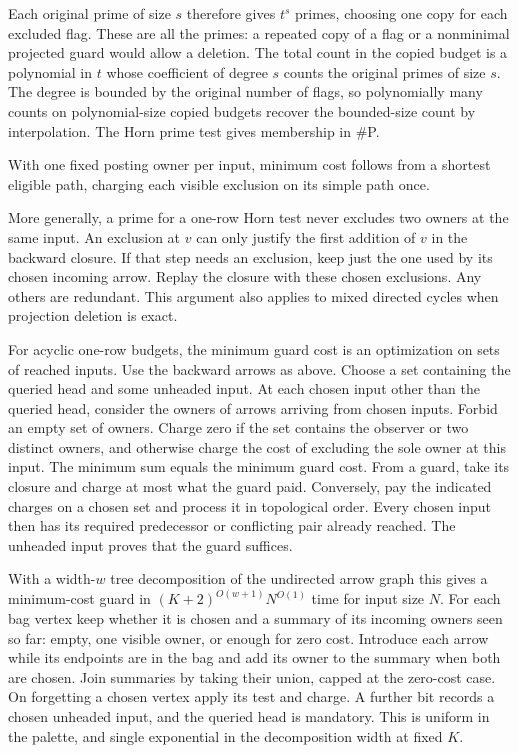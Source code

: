 Each original prime of size $s$ therefore gives $t^s$
primes, choosing one copy for each excluded flag.
These are all the primes: a repeated copy of a flag
or a nonminimal projected guard would allow a deletion.
The total count in the copied budget is a polynomial
in $t$ whose coefficient of degree $s$ counts the
original primes of size $s$. The degree is bounded
by the original number of flags, so polynomially
many counts on polynomial-size copied budgets recover
the bounded-size count by interpolation. The Horn
prime test gives membership in \#P.

With one fixed posting owner per input, minimum cost follows from a
shortest eligible path, charging each visible
exclusion on its simple path once.

More generally, a prime for a one-row Horn test never
excludes two owners at the same input. An exclusion
at $v$ can only justify the first addition of $v$ in
the backward closure. If that step needs an exclusion,
keep just the one used by its chosen incoming arrow.
Replay the closure with these chosen exclusions.
Any others are redundant. This argument also applies
to mixed directed cycles when projection deletion is
exact.

For acyclic one-row budgets, the minimum guard cost is
an optimization on sets of reached inputs. Use the
backward arrows as above. Choose a set containing the
queried head and some unheaded input. At each chosen
input other than the queried head, consider the owners
of arrows arriving from chosen inputs. Forbid an empty
set of owners. Charge zero if the set contains the
observer or two distinct owners, and otherwise charge
the cost of excluding the sole owner at this input.
The minimum sum equals the minimum guard cost. From a
guard, take its closure and charge at most what the guard
paid. Conversely, pay the indicated charges on a chosen
set and process it in topological order. Every chosen
input then has its required predecessor or conflicting
pair already reached. The unheaded input proves that
the guard suffices.

With a width-$w$ tree decomposition of the undirected
arrow graph this gives a minimum-cost guard in
$(K+2)^{O(w+1)}N^{O(1)}$ time for input size $N$.
For each bag vertex keep whether it is chosen and a
summary of its incoming owners seen so far: empty,
one visible owner, or enough for zero cost. Introduce
each arrow while its endpoints are in the bag and
add its owner to the summary when both are chosen.
Join summaries by taking their union, capped at the
zero-cost case. On forgetting a chosen vertex apply
its test and charge. A further bit records a chosen
unheaded input, and the queried head is mandatory.
This is uniform in the palette, and single exponential
in the decomposition width at fixed $K$.

